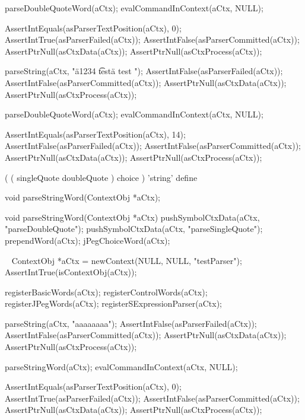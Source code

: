   parseDoubleQuoteWord(aCtx);
  evalCommandInContext(aCtx, NULL);
  
  AssertIntEquals(asParserTextPosition(aCtx), 0);
  AssertIntTrue(asParserFailed(aCtx));
  AssertIntFalse(asParserCommitted(aCtx));
  AssertPtrNull(asCtxData(aCtx));
  AssertPtrNull(asCtxProcess(aCtx));
\stopCTest
\stopTestCase

\startCTest
  parseString(aCtx, "\"a1234 \t test\" a test ");
  AssertIntFalse(asParserFailed(aCtx));
  AssertIntFalse(asParserCommitted(aCtx));
  AssertPtrNull(asCtxData(aCtx));
  AssertPtrNull(asCtxProcess(aCtx));
  
  parseDoubleQuoteWord(aCtx);
  evalCommandInContext(aCtx, NULL);
  
  AssertIntEquals(asParserTextPosition(aCtx), 14);
  AssertIntFalse(asParserFailed(aCtx));
  AssertIntFalse(asParserCommitted(aCtx));
  AssertPtrNull(asCtxData(aCtx));
  AssertPtrNull(asCtxProcess(aCtx));
\stopCTest
\stopTestCase
\stopTestSuite

\startTestSuite[parseStringWord]

\starttyping
(
  ( singleQuote doubleQuote ) choice
) 'string' define
\stoptyping

\startCHeader
void parseStringWord(ContextObj *aCtx);
\stopCHeader

\startCCode
void parseStringWord(ContextObj *aCtx) {
  pushSymbolCtxData(aCtx, "parseDoubleQuote");
  pushSymbolCtxData(aCtx, "parseSingleQuote");
  prependWord(aCtx);
  jPegChoiceWord(aCtx);
}
\stopCCode

\CTestsSuiteSetup\
\startCTest
  ContextObj *aCtx = newContext(NULL, NULL, "testParser");
  AssertIntTrue(isContextObj(aCtx));
  
  registerBasicWords(aCtx);
  registerControlWords(aCtx);
  registerJPegWords(aCtx);
  registerSExpressionParser(aCtx);
\stopCTest

\startCTest
  parseString(aCtx, "aaaaaaaa");
  AssertIntFalse(asParserFailed(aCtx));
  AssertIntFalse(asParserCommitted(aCtx));
  AssertPtrNull(asCtxData(aCtx));
  AssertPtrNull(asCtxProcess(aCtx));
  
  parseStringWord(aCtx);
  evalCommandInContext(aCtx, NULL);
  
  AssertIntEquals(asParserTextPosition(aCtx), 0);
  AssertIntTrue(asParserFailed(aCtx));
  AssertIntFalse(asParserCommitted(aCtx));
  AssertPtrNull(asCtxData(aCtx));
  AssertPtrNull(asCtxProcess(aCtx));
\stopCTest
\stopTestCase

